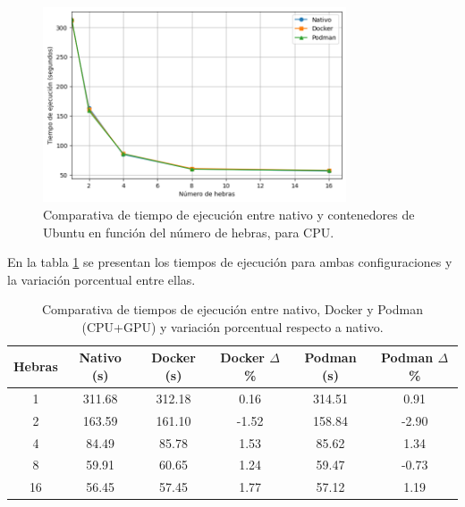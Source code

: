 \begin{figure}[H]
    \centering
    \includegraphics[width=0.8\textwidth]{imagenes/cap5/single-node_ubuntu_container_vs_native_time.png}
    \caption{Comparativa de tiempo de ejecución entre nativo y contenedores de Ubuntu en función del número de hebras, para CPU.}
    \label{fig:single-node_ubuntu_container_vs_native_time}
\end{figure}

En la tabla \ref{tab:single-node_ubuntu_container_vs_native} se presentan los tiempos de ejecución para ambas configuraciones y la variación porcentual entre ellas.

\begin{table}[ht]
    \centering
    \begin{tabular}{|c|c|c|c|c|c|}
        \hline
        \textbf{Hebras} & \textbf{Nativo (s)} & \textbf{Docker (s)} & \textbf{Docker $\Delta$\%} & \textbf{Podman (s)} & \textbf{Podman $\Delta$\%} \\
        \hline
        1               & 311.68              & 312.18              & 0.16                       & 314.51              & 0.91                       \\
        2               & 163.59              & 161.10              & -1.52                      & 158.84              & -2.90                      \\
        4               & 84.49               & 85.78               & 1.53                       & 85.62               & 1.34                       \\
        8               & 59.91               & 60.65               & 1.24                       & 59.47               & -0.73                      \\
        16              & 56.45               & 57.45               & 1.77                       & 57.12               & 1.19                       \\
        \hline
    \end{tabular}
    \caption{Comparativa de tiempos de ejecución entre nativo, Docker y Podman (CPU+GPU) y variación porcentual respecto a nativo.}
    \label{tab:single-node_ubuntu_container_vs_native}
\end{table}

